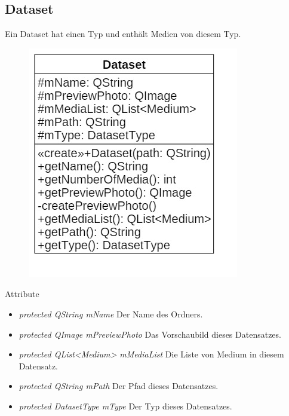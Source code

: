 \subsection*{Dataset}
Ein Dataset hat einen Typ und enthält Medien von diesem Typ.

\begin{figure}[H]
\centering
\includegraphics[scale=0.5]{img/Klassendiagramm/Klassen/Dataset}
\label{fig:dataset}
\end{figure}

Attribute
\begin{itemize}
\item\textit{protected QString mName} Der Name des Ordners.
\item\textit{protected QImage mPreviewPhoto} Das Vorschaubild dieses Datensatzes.
\item\textit{protected QList<Medium> mMediaList} Die Liste von Medium in diesem Datensatz.
\item\textit{protected QString mPath} Der Pfad dieses Datensatzes.
\item\textit{protected DatasetType mType} Der Typ dieses Datensatzes.
\end{itemize}

